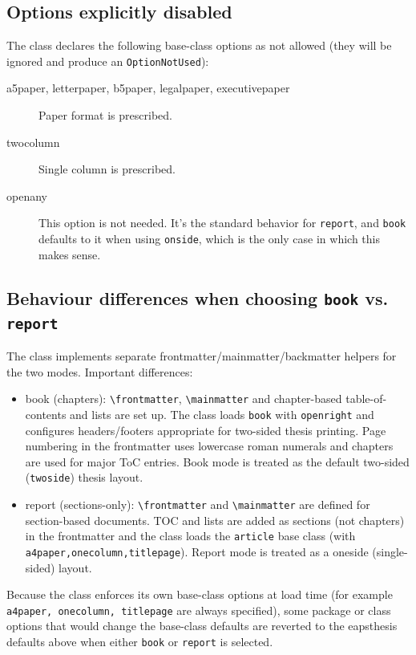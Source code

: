 \documentclass[11pt]{article}
\begin{document}
\subsection{Options explicitly disabled}

The class declares the following base-class options as not allowed (they will be ignored and produce an \texttt{OptionNotUsed}):
\begin{description}
  \item[a5paper, letterpaper, b5paper, legalpaper, executivepaper] Paper format is prescribed.
  \item[twocolumn] Single column is prescribed. 
  \item[openany] This option is not needed. It's the standard behavior for \texttt{report}, and \texttt{book} defaults
    to it when using \texttt{onside}, which is the only case in which this makes sense.
\end{description}

\subsection{Behaviour differences when choosing \texttt{book} vs. \texttt{report}}
The class implements separate frontmatter/mainmatter/backmatter helpers for the two modes. Important differences:
\begin{itemize}
  \item book (chapters): \verb|\frontmatter|, \verb|\mainmatter| and chapter-based table-of-contents and lists are set up. The class loads \texttt{book} with \texttt{openright} and configures headers/footers appropriate for two-sided thesis printing. Page numbering in the frontmatter uses lowercase roman numerals and chapters are used for major ToC entries. Book mode is treated as the default two-sided (\texttt{twoside}) thesis layout.
  \item report (sections-only): \verb|\frontmatter| and \verb|\mainmatter| are defined for section-based documents. TOC and lists are added as sections (not chapters) in the frontmatter and the class loads the \texttt{article} base class (with \texttt{a4paper,onecolumn,titlepage}). Report mode is treated as a oneside (single-sided) layout.
\end{itemize}

Because the class enforces its own base-class options at load time (for example \texttt{a4paper, onecolumn, titlepage} 
are always specified), some package or class options that would change the base-class defaults are reverted to
the eapsthesis defaults above when either \texttt{book} or \texttt{report} is selected.
\end{document}
